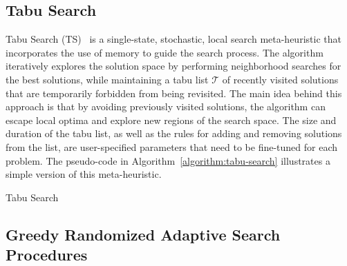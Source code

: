 \subsection{Tabu Search}

Tabu Search (TS)~\cite{glover1999tabu,gendreau2010tabua,luke2013essentialsa,
    blummetaheuristics} is a single-state, stochastic, local search meta-heuristic
that incorporates the use of memory to guide the search process. The algorithm
iteratively explores the solution space by performing neighborhood searches for
the best solutions, while maintaining a tabu list $\mathcal{T}$ of recently
visited solutions that are temporarily forbidden from being revisited. The main
idea behind this approach is that by avoiding previously visited solutions, the
algorithm can escape local optima and explore new regions of the search space.
The size and duration of the tabu list, as well as the rules for adding and
removing solutions from the list, are user-specified parameters that need to be
fine-tuned for each problem. The pseudo-code in
Algorithm~\ref{algorithm:tabu-search} illustrates a simple version of this
meta-heuristic.

\begin{algorithm}[htb!]
    \DontPrintSemicolon
    \caption{Tabu Search}
    \label{algorithm:tabu-search}
\end{algorithm}

\subsection{Greedy Randomized Adaptive Search Procedures}

